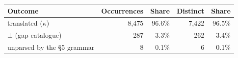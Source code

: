 \begin{tabular}{@{}lrrrr@{}}
\toprule
Outcome & Occurrences & Share & Distinct & Share \\
\midrule
translated ($\kappa$) & 8,475 & 96.6\% & 7,422 & 96.5\% \\
$\bot$ (gap catalogue) & 287 & 3.3\% & 262 & 3.4\% \\
unparsed by the §5 grammar & 8 & 0.1\% & 6 & 0.1\% \\
\bottomrule
\end{tabular}
